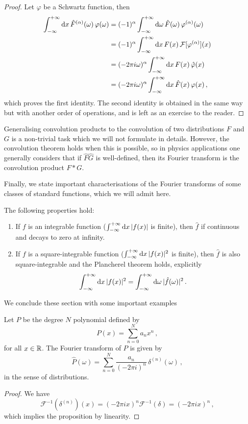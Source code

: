 \begin{proof}
  Let $\varphi$ be a Schwartz function, then
  \begin{align}
    \int_{-\infty}^{+\infty}\mathrm{d}{x}\,\hat{F}^{(\alpha)}(\omega)\,\varphi(\omega)
    &=(-1)^{\alpha}\int_{-\infty}^{+\infty}\mathrm{d}{\omega}\,\hat{F}(\omega)\,\varphi^{(\alpha)}(\omega)\notag\\
    &=(-1)^{\alpha}\int_{-\infty}^{+\infty}\mathrm{d}{x}\,F(x)\,\mathcal{F}[\varphi^{(\alpha)}](x)\notag\\
    &=(-2\pi i\omega)^{\alpha}\int_{-\infty}^{+\infty}\mathrm{d}{x}\,F(x)\,\hat{\varphi}(x)\notag\\
    &=(-2\pi i\omega)^{\alpha}\int_{-\infty}^{+\infty}\mathrm{d}{x}\,\hat{F}(x)\,\varphi(x)\,,
  \end{align}
  which proves the first identity. The second identity is obtained in the same way but
  with another order of operations, and is left as an exercise to the reader.
\end{proof}
Generalising convolution products to the convolution of two distributions $F$ and $G$ is a
non-trivial task which we will not formulate in details. However, the convolution theorem
holds when this is possible, so in physics applications one generally considers that if
$\hat{F}\hat{G}$ is well-defined, then its Fourier transform is the convolution product
$F\ast G$.

Finally, we state important characterisations of the Fourier transforms of some classes of
standard functions, which we will admit here.
\begin{theorem}
  The following properties hold:
  \begin{enumerate}
    \item If $f$ is an integrable function (\ie $\int_{-\infty}^{+\infty}\mathrm{d}{x}\,|f(x)|$ is finite), then
      $\hat{f}$ if continuous and decays to zero at infinity.
    \item If $f$ is a square-integrable function (\ie $\int_{-\infty}^{+\infty}\mathrm{d}{x}\,|f(x)|^2$ is finite), then
      $\hat{f}$ is also square-integrable and the Plancherel theorem holds, explicitly
      \begin{equation}
        \int_{-\infty}^{+\infty}\mathrm{d}{x}\,|f(x)|^2=\int_{-\infty}^{+\infty}\mathrm{d}{\omega}\,|\hat{f}(\omega)|^2\,.
      \end{equation}
  \end{enumerate}
\end{theorem}
We conclude these section with some important examples
\begin{proposition}
  Let $P$ be the degree $N$ polynomial defined by
  \begin{equation}
    P(x)=\sum_{n=0}^Na_nx^n\,,
  \end{equation}
  for all $x\in\mathbb{R}$. The Fourier transform of $P$ is given by
  \begin{equation}
    \hat{P}(\omega)=\sum_{n=0}^N\frac{a_n}{(-2\pi i)^n}\,\delta^{(n)}(\omega)\,,
  \end{equation}
  in the sense of distributions.
\end{proposition}
\begin{proof}
  We have
  \begin{equation}
    \mathcal{F}^{-1}(\delta^{(n)})(x)=(-2\pi i x)^n\mathcal{F}^{-1}(\delta)=
    (-2\pi i x)^n\,,
  \end{equation}
  which implies the proposition by linearity.
\end{proof}
